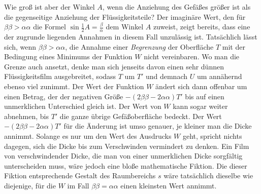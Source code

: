 Wie groß ist aber der Winkel $A$, wenn die Anziehung des Gefäßes größer ist als die gegenseitige Anziehung der Flüssigkeitsteile? Der imaginäre Wert, den für $\beta\beta>\alpha\alpha$ die Formel $\sin\frac12 A=\frac\beta\alpha$ dem Winkel $A$ zuweist, zeigt bereits, dass eine der zugrunde liegenden Annahmen in diesem Fall unzulässig ist. Tatsächlich lässt sich, wenn $\beta\beta>\alpha\alpha$, die Annahme einer \textit{Begrenzung} der Oberfläche $T$ mit der Bedingung eines Minimums der Funktion $W$ nicht vereinbaren. Wo man die Grenze auch ansetzt, denke man sich jenseits davon einen sehr dünnen Flüssigkeitsfilm ausgebreitet, sodass $T$ um $T'$ und demnach $U$ um annähernd ebenso viel zunimmt. Der Wert der Funktion $W$ ändert sich dann offenbar um einen Betrag, der der negativen Größe $-(2\beta\beta-2\alpha\alpha)T'$ bis auf einen unmerklichen Unterschied gleich ist. Der Wert von $W$ kann sogar weiter abnehmen, bis $T'$ die ganze übrige Gefäßoberfläche bedeckt. Der Wert $-(2\beta\beta-2\alpha\alpha)T'$ für die Änderung ist umso genauer, je kleiner man die Dicke annimmt. Solange es nur um den Wert des Ausdrucks $W$ geht, spricht nichts dagegen, sich die Dicke bis zum Verschwinden vermindert zu denken. Ein Film von verschwindender Dicke, die man von einer unmerklichen Dicke sorgfältig unterscheiden muss, wäre jedoch eine bloße mathematische Fiktion. Die dieser Fiktion entsprechende Gestalt des Raumbereichs $s$ wäre tatsächlich dieselbe wie diejenige, für die $W$ im Fall $\beta\beta=\alpha\alpha$ einen kleinsten Wert annimmt.

